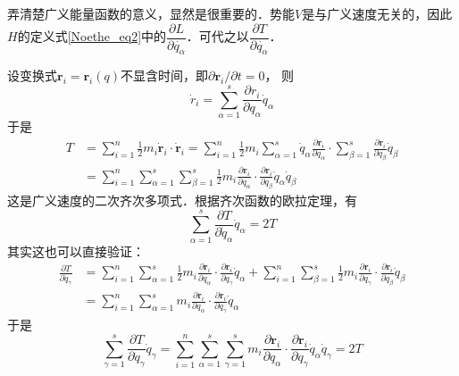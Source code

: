 弄清楚广义能量函数的意义，显然是很重要的．势能$V$是与广义速度无关的，因此$H$的定义式\autoref{Noethe_eq2}中的$\dfrac{\partial L}{\partial \dot{q_\alpha}}$．可代之以$\dfrac{\partial T}{\partial \dot{q_\alpha}}$．

设变换式$\boldsymbol{r}_{i}=\boldsymbol{r}_{i}(q)$不显含时间，即$\partial \boldsymbol{r}_{i} / \partial t=0$， 则
\begin{equation}
\dot{r}_{i}=\sum_{\alpha=1}^{s} \frac{\partial r_{i}}{\partial q_{\alpha}} \dot{q}_{\alpha}
\end{equation}
于是
\begin{equation}
\begin{aligned} T &=\sum_{i=1}^{n} \frac{1}{2} m_{i} \dot{\boldsymbol{r}}_{i} \cdot \dot{\boldsymbol{r}}_{i}=\sum_{i=1}^{n} \frac{1}{2} m_{i} \sum_{\alpha=1}^{s} \dot{q}_{\alpha} \frac{\partial \boldsymbol{r}_{i}}{\partial q_{\alpha}} \cdot \sum_{\beta=1}^{s} \frac{\partial \boldsymbol{r}_{i}}{\partial q_{\beta}} \dot{q}_{\beta} \\ &=\sum_{i=1}^{n} \sum_{\alpha=1}^{s} \sum_{\beta=1}^{s} \frac{1}{2} m_{i} \frac{\partial \boldsymbol{r}_{i}}{\partial q_{\alpha}} \cdot \frac{\partial \boldsymbol{r}_{i}}{\partial q_{\beta}} \dot{q}_{\alpha} \dot{q}_{\beta} \end{aligned}
\end{equation}
这是广义速度的二次齐次多项式．根据齐次函数的欧拉定理，有
\begin{equation} \label{Noethe_eq3}
\sum_{\alpha=1}^{s} \frac{\partial T}{\partial \dot{q}_{\alpha}} \dot{q}_{\alpha}=2 T
\end{equation}
其实这也可以直接验证：
\begin{equation}
\begin{aligned} \frac{\partial T}{\partial \dot{q}_{\gamma}} &=\sum_{i=1}^{n} \sum_{\alpha=1}^{s} \frac{1}{2} m_{i} \frac{\partial \boldsymbol{r}_{i}}{\partial q_{\alpha}} \cdot \frac{\partial \boldsymbol{r}_{i}}{\partial q_{\gamma}} \dot{q}_{\alpha}+\sum_{i=1}^{n} \sum_{\beta=1}^{s} \frac{1}{2} m_{i} \frac{\partial \boldsymbol{r}_{i}}{\partial q_{\gamma}} \cdot \frac{\partial \boldsymbol{r}_{i}}{\partial q_{\beta}} \dot{q}_{\beta} \\ &=\sum_{i=1}^{n} \sum_{\alpha=1}^{s} m_{i} \frac{\partial \boldsymbol{r}_{i}}{\partial q_{\alpha}} \cdot \frac{\partial \boldsymbol{r}_{i}}{\partial q_{\gamma}} \dot{q}_{\alpha} \end{aligned}
\end{equation}
于是
\begin{equation}
\sum_{\gamma=1}^{s} \frac{\partial T}{\partial \dot{q}_{\gamma}} \dot{q}_{\gamma}=\sum_{i=1}^{n} \sum_{\alpha=1}^{s} \sum_{\gamma=1}^{s} m_{i} \frac{\partial \boldsymbol{r}_{i}}{\partial q_{\alpha}} \cdot \frac{\partial \boldsymbol{r}_{i}}{\partial q_{\gamma}} \dot{q}_{\alpha} \dot{q}_{\gamma}=2 T
\end{equation}

